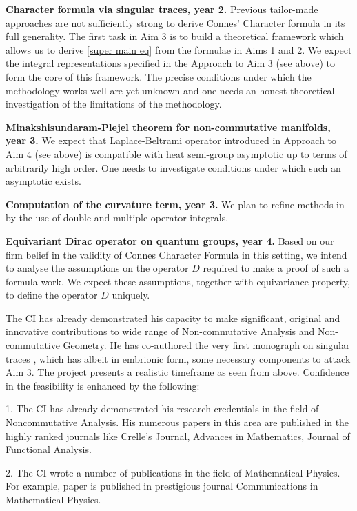 \documentclass[12pt]{article}
\newcommand{\archeading}[1]{\vspace{.3cm} \noindent{\bfseries #1} \vspace{.1cm}   }
\begin{document}
{\bf Character formula via singular traces, year 2.} Previous tailor-made approaches \cite{CGRS} are not sufficiently strong to derive Connes' Character formula in its full generality. The first task in Aim 3 is to build a theoretical framework which allows us to derive \eqref{super main eq} from the formulae in Aims 1 and 2. We expect the integral representations specified in the Approach to Aim 3 (see above) to form the core of this framework. The precise conditions under which the methodology works well are yet unknown and one needs an honest theoretical investigation of the limitations of the methodology.


{\bf Minakshisundaram-Plejel theorem for non-commutative manifolds, year 3.} We expect that Laplace-Beltrami operator introduced in Approach to Aim 4 (see above) is compatible with heat semi-group asymptotic up to terms of arbitrarily high order. One needs to investigate conditions under which such an asymptotic exists. 

{\bf Computation of the curvature term, year 3.} We plan to refine methods in \cite{Lesch}  by the use of double and multiple operator integrals. 

{\bf Equivariant Dirac operator on quantum groups, year 4.} Based on our firm belief in the validity of Connes Character Formula in this setting, we intend to analyse the assumptions on the operator $D$ required to make a proof of such a formula work. We expect these assumptions, together with equivariance property, to define the operator $D$ uniquely.

\bigskip\archeading{Feasibility and Strategic Alignment}
The CI has already demonstrated his capacity to make significant, original and innovative contributions to wide range of Non-commutative Analysis and Non-commutative Geometry. He has co-authored the very first monograph on singular traces \cite{book}, which has albeit in embrionic form, some necessary components to attack Aim 3. The project presents a realistic timeframe as seen from above. Confidence in the feasibility is enhanced by the following:

1. The CI has already demonstrated his research credentials in the field of Noncommutative Analysis. His numerous papers in this area are published in the highly ranked journals like Crelle's Journal, Advances in Mathematics, Journal of Functional Analysis.

2. The CI wrote a number of publications in the field of Mathematical Physics. For example, paper \cite{SZ-cmp} is published in prestigious journal Communications in Mathematical Physics.
\end{document}

